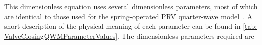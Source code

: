 This dimensionless equation uses several dimensionless parameters, most of which are identical to those used for the spring-operated PRV quarter-wave model~\cite{Hos2016DynamicService}. A short description of the physical meaning of each parameter can be found in \cref{tab: ValveClosingQWMParameterValues}. The dimensionless parameters required are
